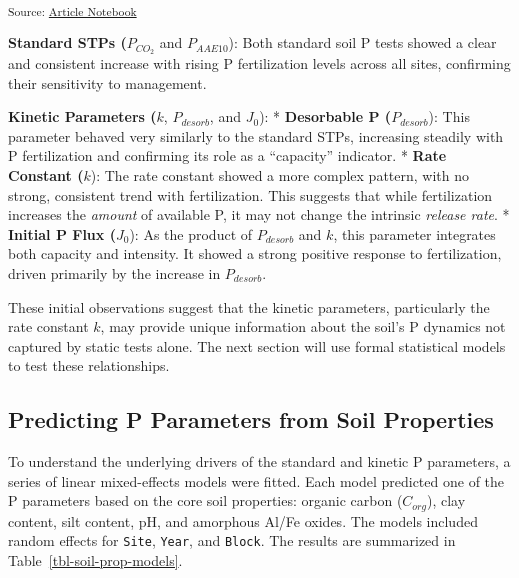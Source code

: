 \documentclass[
  a4paper,
]{article}
\begin{document}
\textsubscript{Source:
\href{https://Andrapodon.github.io/Master-Thesis-P-kinetics/index.qmd.html}{Article
Notebook}}

\textbf{Standard STPs (}\(P_{CO_2}\) and \(P_{AAE10}\)): Both standard
soil P tests showed a clear and consistent increase with rising P
fertilization levels across all sites, confirming their sensitivity to
management.

\textbf{Kinetic Parameters (}\(k\), \(P_{desorb}\), and \(J_0\)): *
\textbf{Desorbable P (}\(P_{desorb}\)): This parameter behaved very
similarly to the standard STPs, increasing steadily with P fertilization
and confirming its role as a ``capacity'' indicator. * \textbf{Rate
Constant (}\(k\)): The rate constant showed a more complex pattern, with
no strong, consistent trend with fertilization. This suggests that while
fertilization increases the \emph{amount} of available P, it may not
change the intrinsic \emph{release rate}. * \textbf{Initial P Flux
(}\(J_0\)): As the product of \(P_{desorb}\) and \(k\), this parameter
integrates both capacity and intensity. It showed a strong positive
response to fertilization, driven primarily by the increase in
\(P_{desorb}\).

These initial observations suggest that the kinetic parameters,
particularly the rate constant \(k\), may provide unique information
about the soil's P dynamics not captured by static tests alone. The next
section will use formal statistical models to test these relationships.

\subsection{Predicting P Parameters from Soil
Properties}\label{sec-p-params-soil-props}

To understand the underlying drivers of the standard and kinetic P
parameters, a series of linear mixed-effects models were fitted. Each
model predicted one of the P parameters based on the core soil
properties: organic carbon (\(C_{org}\)), clay content, silt content,
pH, and amorphous Al/Fe oxides. The models included random effects for
\texttt{Site}, \texttt{Year}, and \texttt{Block}. The results are
summarized in Table~\ref{tbl-soil-prop-models}.
\end{document}
